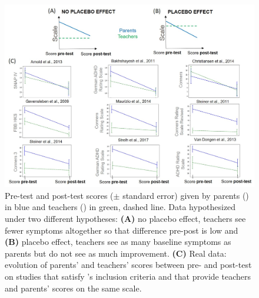\begin{figure}[h!]
  \centering
  \includegraphics[width=1.0\linewidth]{figures/discussion_on_placebo_effect_colors_2-columns_fitting_image.jpg}
  \caption{Pre-test and post-test scores ($\pm$ standard error) given by parents () in blue and teachers () in green, dashed line. 
	Data hypothesized under two different hypotheses: \textbf{(A)} no placebo effect, teachers see fewer symptoms altogether so that difference pre-post is low and 
	\textbf{(B)} placebo effect, teachers see as many baseline symptoms as parents but do not see as much improvement. \textbf{(C)} Real data: evolution of parents' 
	and teachers' scores between pre- and post-test on studies that satisfy \citeauthor{Cortese2016}'s inclusion criteria and that provide teachers and parents'
	scores on the same scale.}
  \label{Figure:discussion_on_placebo_effect_colors_2-columns_fitting_image}
\end{figure} 
